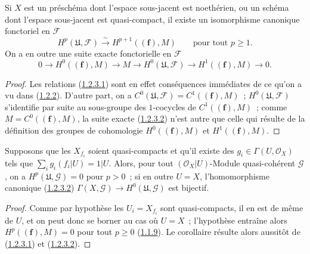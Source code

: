 \begin{proposition}[1.2.3]
\label{III.1.2.3-fr}
Si $X$ est un préschéma dont l'espace sous-jacent est noethérien, ou un
schéma dont l'espace sous-jacent est quasi-compact, il existe un isomorphisme
canonique fonctoriel en $\mathcal F$
\begin{equation}
\label{III.1.2.3.1-fr}
\tag{1.2.3.1}
H^p(\mathfrak U,\mathcal F)\xrightarrow{\sim}H^{p+1}((\mathbf f),M)
\qquad\text{pour tout }p\geq1.
\end{equation}
On a en outre une suite exacte fonctorielle en $\mathcal F$
\begin{equation}
\label{III.1.2.3.2-fr}
\tag{1.2.3.2}
0\longrightarrow H^0((\mathbf f),M)\longrightarrow M
\longrightarrow H^0(\mathfrak U,\mathcal F)
\longrightarrow H^1((\mathbf f),M)\longrightarrow0.
\end{equation}
\end{proposition}

\begin{proof}
Les relations (\hyperref[III.1.2.3.1-fr]{1.2.3.1}) sont en effet conséquences
immédiates de ce qu'on a vu dans (\hyperref[III.1.2.2-fr]{1.2.2}). D'autre
part, on a
$C^0(\mathfrak U,\mathcal F)=C^1((\mathbf f),M)$~;
$H^0(\mathfrak U,\mathcal F)$ s'identifie par suite au sous-groupe des
$1$-cocycles de $C^1((\mathbf f),M)$~; comme
$M=C^0((\mathbf f),M)$, la suite exacte
(\hyperref[III.1.2.3.2-fr]{1.2.3.2}) n'est autre que celle qui résulte de la
définition des groupes de cohomologie $H^0((\mathbf f),M)$ et
$H^1((\mathbf f),M)$.
\end{proof}

\begin{corollary}[1.2.4]
\label{III.1.2.4-fr}
Supposons que les $X_{f_i}$ soient quasi-compacts et qu'il existe des
$g_i\in\Gamma(U,\mathcal O_X)$ tels que
$\sum_i g_i(f_i\vert U)=1\vert U$. Alors, pour tout
$(\mathcal O_X\vert U)$-Module quasi-cohérent $\mathcal G$, on a
$H^p(\mathfrak U,\mathcal G)=0$ pour $p>0$~; si en outre $U=X$,
l'homomorphisme canonique (\hyperref[III.1.2.3.2-fr]{1.2.3.2})
$\Gamma(X,\mathcal G)\to H^0(\mathfrak U,\mathcal G)$ est bijectif.
\end{corollary}

\begin{proof}
Comme par hypothèse les $U_i=X_{f_i}$ sont quasi-compacts, il en est de même
de $U$, et on peut donc se borner au cas où $U=X$~; l'hypothèse entraîne alors
$H^p((\mathbf f),M)=0$ pour tout $p\geq0$
(\hyperref[III.1.1.9-fr]{1.1.9}). Le corollaire résulte alors aussitôt de
(\hyperref[III.1.2.3.1-fr]{1.2.3.1}) et
(\hyperref[III.1.2.3.2-fr]{1.2.3.2}).
\end{proof}

